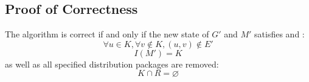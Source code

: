 \documentclass[a4paper,12pt]{article}
\makeatletter
\renewcommand*{\eqref}[1]{\hyperref[{#1}]{\textup{\tagform@{\ref*{#1}}}}}
\makeatother
\begin{document}
\subsection{Proof of Correctness}
The algorithm is correct if and only if the new state of $G'$ and $M'$
satisfies \eqref{digraph} and \eqref{useful}:
\begin{equation}\label{output-digraph}
  \forall u \in K, \forall v \notin K, (u, v) \notin E'
\end{equation}
\begin{equation}\label{output-useful}
  I(M') = K
\end{equation}
as well as all specified distribution packages are removed:
\begin{equation}\label{rm}
  K \cap R = \varnothing
\end{equation}
\end{document}
